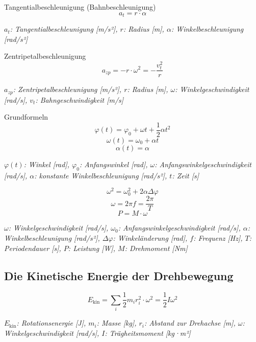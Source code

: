 \documentclass[a4paper,10pt]{article}
\newenvironment{displayformula}
{
	\begin{framed}
		\color{formulaColor}
	}
	{\end{framed}}
\newcommand{\formulalegend}[1]{%
	\par\vspace{0.5ex}%
	{{\color{legendColor}\RaggedRight\small\textit{#1}}}%
	\par\vspace{1.5ex}%
}
\begin{document}
\begin{displayformula}
	Tangentialbeschleunigung (Bahnbeschleunigung)
	\[
	a_t = r \cdot \alpha
	\]
\end{displayformula}
\formulalegend{
	\( a_t \): Tangentialbeschleunigung [m/s²], \( r \): Radius [m], \( \alpha \): Winkelbeschleunigung [rad/s²]
}

\begin{displayformula}
	Zentripetalbeschleunigung
	\[
	a_{zp} = -r \cdot \omega^2 = - \frac{v_t^2}{r}
	\]
\end{displayformula}
\formulalegend{
	\( a_{zp} \): Zentripetalbeschleunigung [m/s²], \( r \): Radius [m], \( \omega \): Winkelgeschwindigkeit [rad/s], \( v_t \): Bahngeschwindigkeit [m/s]
}

\begin{displayformula}
	Grundformeln
	\[
	\varphi (t) = \varphi_0 + \omega t + \frac{1}{2} \alpha t^2
	\]
	\[
	\omega (t) = \omega_0 + \alpha t
	\]
	\[
	\alpha (t) = \alpha
	\]
\end{displayformula}
\formulalegend{
	\( \varphi(t) \): Winkel [rad], \( \varphi_0 \): Anfangswinkel [rad], \( \omega \): Anfangswinkelgeschwindigkeit [rad/s], \( \alpha \): konstante Winkelbeschleunigung [rad/s²], \( t \): Zeit [s]
}

\begin{displayformula}
	\[
	\omega^2 = \omega_0^2 + 2\alpha \Delta\varphi
	\]
	\[
	\omega = 2\pi f = \frac{2\pi}{T}
	\]
	\[
	P = M \cdot \omega
	\]
\end{displayformula}
\formulalegend{
	\( \omega \): Winkelgeschwindigkeit [rad/s], \( \omega_0 \): Anfangswinkelgeschwindigkeit [rad/s], \( \alpha \): Winkelbeschleunigung [rad/s²], \( \Delta \varphi \): Winkeländerung [rad], \( f \): Frequenz [Hz], \( T \): Periodendauer [s], \( P \): Leistung [W], \( M \): Drehmoment [Nm]
}

\subsection{Die Kinetische Energie der Drehbewegung}

\begin{displayformula}
	\[
	E_{\text{kin}} = \sum_i \frac{1}{2} m_i r_i^2 \cdot \omega^2 = \frac{1}{2} I \omega^2
	\]
\end{displayformula}
\formulalegend{
	\( E_{\text{kin}} \): Rotationsenergie [J], \( m_i \): Masse [kg], \( r_i \): Abstand zur Drehachse [m], \( \omega \): Winkelgeschwindigkeit [rad/s], \( I \): Trägheitsmoment [kg·m²]
}
\end{document}
